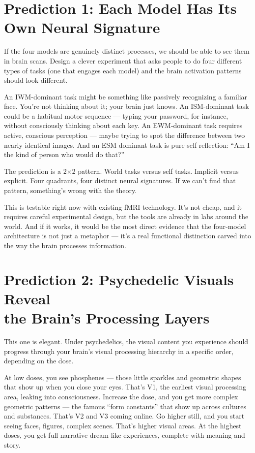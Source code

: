\documentclass[11pt, twoside, openright]{book}
\begin{document}
\section*{Prediction 1: Each Model Has Its Own Neural Signature}

If the four models are genuinely distinct processes, we should be able to see them in brain scans. Design a clever experiment that asks people to do four different types of tasks (one that engages each model) and the brain activation patterns should look different.

An IWM-dominant task might be something like passively recognizing a familiar face. You're not thinking about it; your brain just knows. An ISM-dominant task could be a habitual motor sequence --- typing your password, for instance, without consciously thinking about each key. An EWM-dominant task requires active, conscious perception --- maybe trying to spot the difference between two nearly identical images. And an ESM-dominant task is pure self-reflection: ``Am I the kind of person who would do that?''

The prediction is a 2×2 pattern. World tasks versus self tasks. Implicit versus explicit. Four quadrants, four distinct neural signatures. If we can't find that pattern, something's wrong with the theory.

This is testable right now with existing fMRI technology. It's not cheap, and it requires careful experimental design, but the tools are already in labs around the world. And if it works, it would be the most direct evidence that the four-model architecture is not just a metaphor --- it's a real functional distinction carved into the way the brain processes information.

\section*{Prediction 2: Psychedelic Visuals Reveal\\the Brain's Processing Layers}

This one is elegant. Under psychedelics, the visual content you experience should progress through your brain's visual processing hierarchy in a specific order, depending on the dose.

At low doses, you see phosphenes --- those little sparkles and geometric shapes that show up when you close your eyes. That's V1, the earliest visual processing area, leaking into consciousness. Increase the dose, and you get more complex geometric patterns --- the famous ``form constants'' that show up across cultures and substances. That's V2 and V3 coming online. Go higher still, and you start seeing faces, figures, complex scenes. That's higher visual areas. At the highest doses, you get full narrative dream-like experiences, complete with meaning and story.
\end{document}
